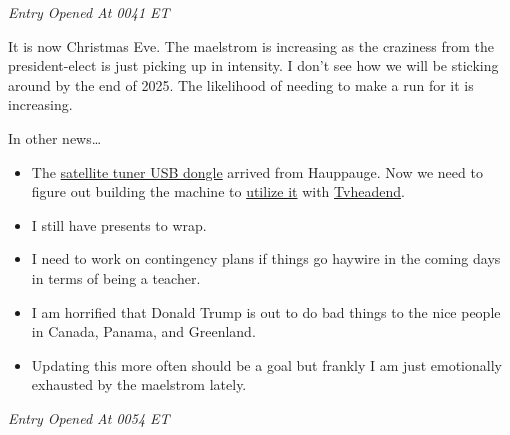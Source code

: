 \emph{Entry Opened At 0041 ET}

It is now Christmas Eve.  The maelstrom is increasing as the craziness from the president-elect is just picking up in intensity.  I don't see how we will be sticking around by the end of 2025.  The likelihood of needing to make a run for it is increasing.

In other news\ldots 

\begin{itemize}
    \item The \href{https://www.hauppauge.com/pages/webstore2/webstore_pctv461e.html}{satellite tuner USB dongle} arrived from Hauppauge.  Now we need to figure out building the machine to \href{https://www.linuxtv.org/wiki/index.php/Pinnacle_PCTV_DVB-S2_Stick_(461e)}{utilize it} with \href{https://tvheadend.org/p/downloads}{Tvheadend}.  
    \item I still have presents to wrap.
    \item I need to work on contingency plans if things go haywire in the coming days in terms of being a teacher.
    \item I am horrified that Donald Trump is out to do bad things to the nice people in Canada, Panama, and Greenland.
    \item Updating this more often should be a goal but frankly I am just emotionally exhausted by the maelstrom lately.
\end{itemize}

\emph{Entry Opened At 0054 ET}

